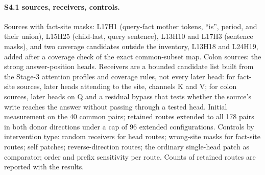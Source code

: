 \paragraph{S4.1 sources, receivers, controls.}
Sources with fact-site masks: L17H1 (query-fact mother tokens, ``is'', period, and
their union), L15H25 (child-last, query sentence), L13H10 and L17H3 (sentence
masks), and two coverage candidates outside the inventory, L13H18 and L24H19,
added after a coverage check of the exact common-subset map. Colon sources: the
strong answer-position heads. Receivers are a bounded candidate list built from the
Stage-3 attention profiles and coverage rules, not every later head: for fact-site
sources, later heads attending to the site, channels K and V; for colon sources,
later heads on Q and a residual bypass that tests whether the source's write reaches
the answer without passing through a tested head. Initial measurement on the 40
common pairs; retained routes extended to all 178 pairs in both donor directions
under a cap of 96 extended configurations. Controls by intervention type: random
receivers for head routes; wrong-site masks for fact-site routes; self patches;
reverse-direction routes; the ordinary single-head patch as comparator; order and
prefix sensitivity per route. Counts of retained routes are reported with the
results.

